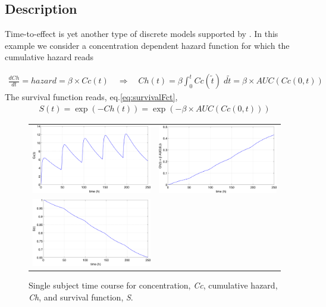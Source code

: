 \subsection{Description}
\label{subsec:exp8_intro} 
Time-to-effect is yet another type of discrete models supported by \pml.
In this example we consider a concentration dependent hazard function for which 
the cumulative hazard reads

\begin{eqnarray}
\frac{dCh}{dt} = hazard = \beta \times Cc(t) \quad \Longrightarrow \quad Ch(t) = \beta \int_0^{t} Cc(\tilde{t}) \;d\tilde{t} = \beta \times AUC(Cc(0,t))  \label{eq:hazardODE1}
\end{eqnarray}
The survival function reads, eq.\eqref{eq:survivalFct},
\begin{eqnarray}
S(t) = \exp(-Ch(t)) = \exp(- \beta \times AUC(Cc(0,t))) \label{eq:survivalFct}
\end{eqnarray}

\begin{figure}[htb!]
\centering
\begin{tabular}{cc}
 \includegraphics[width=70mm]{pics/example8_singleCc} & 
 \includegraphics[width=70mm]{pics/example8_singleCh} \\
 \includegraphics[width=70mm]{pics/example8_singleS} &
\end{tabular}
\caption{Single subject time course for concentration, \emph{Cc}, cumulative hazard, \emph{Ch}, 
and survival function, \emph{S}.}
\end{figure}


